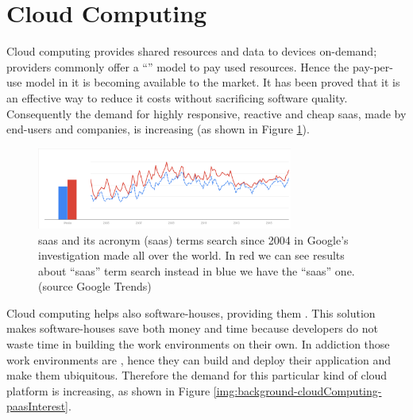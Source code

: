 %
%
\section{Cloud Computing}
\label{sec:background-cloudComputing}
Cloud computing provides shared resources and data to devices on-demand; providers commonly offer a 
``'' model to pay used resources. Hence the pay-per-use model
in \acs{it} is becoming available to the market. It has been proved that it is an effective way to
reduce \acs{it} costs without sacrificing software quality. Consequently the demand for highly
responsive, reactive and cheap \ac{saas}, made by end-users and companies, is increasing (as shown
in Figure \ref{img:background-cloudComputing-saasInterest}).

 
\begin{figure}
	\centering{}
 	\includegraphics[width=0.75\textwidth]{chapters/background/images/saas-interest.png}
 	\caption[Trends in searching ``\acs{saas}'' on Google]{\acf{saas} and its acronym (\acs{saas})
 		terms search since 2004 in Google's investigation made all over the world. In red we can see
 		results about ``\acs{saas}'' term search instead in blue we have the ``\acf{saas}'' one. 
 		(\footnotesize{source	Google Trends}\normalsize{)}}
 	\label{img:background-cloudComputing-saasInterest}
\end{figure}

Cloud computing helps also software-houses, providing them .
This solution makes software-houses save both money and time because developers do not waste time in 
building the work environments on their own. In addiction those work environments are ,
hence they can build and deploy their application and make them ubiquitous. Therefore the demand for
this particular kind of cloud platform is increasing, as shown in Figure
\ref{img:background-cloudComputing-paasInterest}.

